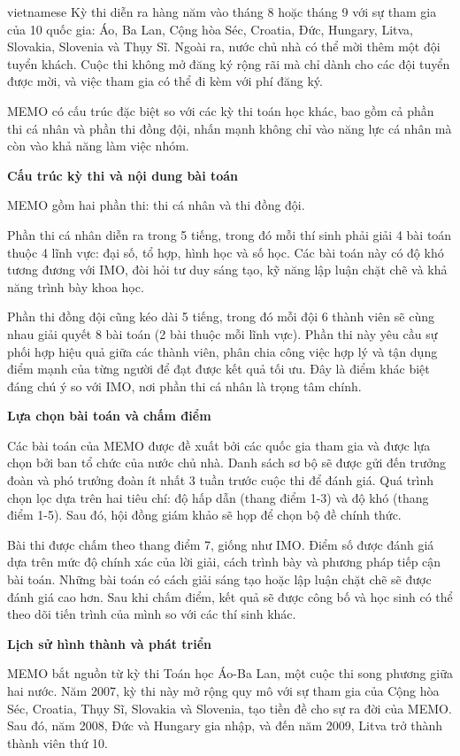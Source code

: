 \documentclass{article}
\begin{document}
\begin{otherlanguage*}{vietnamese}
Kỳ thi diễn ra hàng năm vào tháng 8 hoặc tháng 9 với sự tham gia của 10 quốc gia: Áo, Ba Lan, Cộng hòa Séc, Croatia, Đức, Hungary, Litva, Slovakia, Slovenia và Thụy Sĩ.
Ngoài ra, nước chủ nhà có thể mời thêm một đội tuyển khách. Cuộc thi không mở đăng ký rộng rãi mà chỉ dành cho các đội tuyển được mời, và việc tham gia có thể đi kèm với phí đăng ký.

MEMO có cấu trúc đặc biệt so với các kỳ thi toán học khác, bao gồm cả phần thi cá nhân và phần thi đồng đội, nhấn mạnh không chỉ vào năng lực cá nhân mà còn vào khả năng làm việc nhóm.

\textbf{Cấu trúc kỳ thi và nội dung bài toán}

MEMO gồm hai phần thi: thi cá nhân và thi đồng đội.

Phần thi cá nhân diễn ra trong 5 tiếng, trong đó mỗi thí sinh phải giải 4 bài toán thuộc 4 lĩnh vực: đại số, tổ hợp, hình học và số học.
Các bài toán này có độ khó tương đương với IMO, đòi hỏi tư duy sáng tạo, kỹ năng lập luận chặt chẽ và khả năng trình bày khoa học.

Phần thi đồng đội cũng kéo dài 5 tiếng, trong đó mỗi đội 6 thành viên sẽ cùng nhau giải quyết 8 bài toán (2 bài thuộc mỗi lĩnh vực).
Phần thi này yêu cầu sự phối hợp hiệu quả giữa các thành viên, phân chia công việc hợp lý và tận dụng điểm mạnh của từng người để đạt được kết quả tối ưu.
Đây là điểm khác biệt đáng chú ý so với IMO, nơi phần thi cá nhân là trọng tâm chính.

\textbf{Lựa chọn bài toán và chấm điểm}

Các bài toán của MEMO được đề xuất bởi các quốc gia tham gia và được lựa chọn bởi ban tổ chức của nước chủ nhà.
Danh sách sơ bộ sẽ được gửi đến trưởng đoàn và phó trưởng đoàn ít nhất 3 tuần trước cuộc thi để đánh giá.
Quá trình chọn lọc dựa trên hai tiêu chí: độ hấp dẫn (thang điểm 1-3) và độ khó (thang điểm 1-5). Sau đó, hội đồng giám khảo sẽ họp để chọn bộ đề chính thức.

Bài thi được chấm theo thang điểm 7, giống như IMO. Điểm số được đánh giá dựa trên mức độ chính xác của lời giải, cách trình bày và phương pháp tiếp cận bài toán.
Những bài toán có cách giải sáng tạo hoặc lập luận chặt chẽ sẽ được đánh giá cao hơn.
Sau khi chấm điểm, kết quả sẽ được công bố và học sinh có thể theo dõi tiến trình của mình so với các thí sinh khác.

\textbf{Lịch sử hình thành và phát triển}

MEMO bắt nguồn từ kỳ thi Toán học Áo-Ba Lan, một cuộc thi song phương giữa hai nước.
Năm 2007, kỳ thi này mở rộng quy mô với sự tham gia của Cộng hòa Séc, Croatia, Thụy Sĩ, Slovakia và Slovenia, tạo tiền đề cho sự ra đời của MEMO.
Sau đó, năm 2008, Đức và Hungary gia nhập, và đến năm 2009, Litva trở thành thành viên thứ 10.


\end{otherlanguage*}
\end{document}
